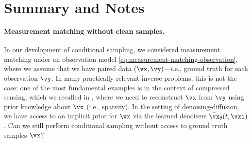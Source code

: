 \documentclass[../../book-main.tex]{subfiles}
\begin{document}




\section{Summary and Notes}
\paragraph{Measurement matching without clean samples.} In our development of
conditional sampling, we considered measurement matching under an observation
model \eqref{eq:measurement-matching-observation}, where we assume that we have
paired data $(\vx, \vy)$---i.e., ground truth for each observation $\vy$.
In many practically-relevant inverse problems, this is not the case: one of the
most fundamental examples is in the context of compressed sensing, which we
recalled in , where we need to reconstruct $\vx$ from $\vy$
using prior knowledge about $\vx$ (i.e., sparsity).
In the setting of denoising-diffusion, we have access to an implicit prior for
$\vx$ via the learned denoisers $\bar{\vx}_{\theta}(t, \vxi)$. Can we still perform 
conditional sampling without access to ground truth samples $\vx$?
\end{document}
